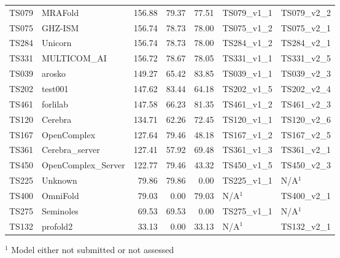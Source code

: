 \begin{table}[ht]
{\begin{tabular}{llrrrll}
TS079 & MRAFold & 156.88 & 79.37 & 77.51 & TS079\_v1\_1 & TS079\_v2\_2 \\ 
TS075 & GHZ-ISM & 156.74 & 78.73 & 78.00 & TS075\_v1\_2 & TS075\_v2\_1 \\ 
TS284 & Unicorn & 156.74 & 78.73 & 78.00 & TS284\_v1\_2 & TS284\_v2\_1 \\ 
TS331 & MULTICOM\_AI & 156.72 & 78.67 & 78.05 & TS331\_v1\_1 & TS331\_v2\_5 \\ 
TS039 & arosko & 149.27 & 65.42 & 83.85 & TS039\_v1\_1 & TS039\_v2\_3 \\ 
TS202 & test001 & 147.62 & 83.44 & 64.18 & TS202\_v1\_5 & TS202\_v2\_4 \\ 
TS461 & forlilab & 147.58 & 66.23 & 81.35 & TS461\_v1\_2 & TS461\_v2\_3 \\ 
TS120 & Cerebra & 134.71 & 62.26 & 72.45 & TS120\_v1\_1 & TS120\_v2\_6 \\ 
TS167 & OpenComplex & 127.64 & 79.46 & 48.18 & TS167\_v1\_2 & TS167\_v2\_5 \\ 
TS361 & Cerebra\_server & 127.41 & 57.92 & 69.48 & TS361\_v1\_3 & TS361\_v2\_1 \\ 
TS450 & OpenComplex\_Server & 122.77 & 79.46 & 43.32 & TS450\_v1\_5 & TS450\_v2\_3 \\ 
TS225 & Unknown & 79.86 & 79.86 & 0.00 & TS225\_v1\_1 & N/A$^{1}$ \\ 
TS400 & OmniFold & 79.03 & 0.00 & 79.03 & N/A$^{1}$ & TS400\_v2\_1 \\ 
TS275 & Seminoles & 69.53 & 69.53 & 0.00 & TS275\_v1\_1 & N/A$^{1}$ \\ 
TS132 & profold2 & 33.13 & 0.00 & 33.13 & N/A$^{1}$ & TS132\_v2\_1 \\ 
\bottomrule
\end{tabular}%
}
\begin{flushleft}\footnotesize $^{1}$ Model either not submitted or not assessed\end{flushleft}
\end{table}
